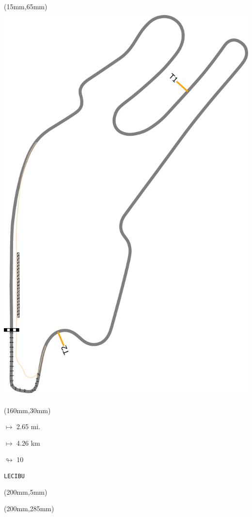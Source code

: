\begin{textblock*}{185mm}(15mm,65mm)%
\centering
\mbox{\includegraphics[width=185mm,height=210mm,keepaspectratio]{PT/LECIBU.pdf}}
\end{textblock*}
\begin{textblock*}{40mm}(160mm,30mm)%
\Large
\par$\mapsto$ 2.65 mi.
\par$\mapsto$ 4.26 km
\par$\looparrowright$ 10
\par\hfill\tiny\tt LECIBU\\
\end{textblock*}
\begin{textblock*}{20mm}(200mm,5mm)%
\fbox{\thepage}
\label{LECIBU}
\end{textblock*}
\begin{textblock*}{20mm}(200mm,285mm)%
\fbox{\thepage}
\end{textblock*}


